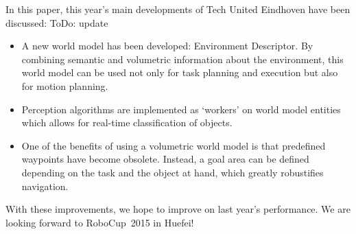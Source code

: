 In this paper, this year's main developments of Tech United Eindhoven have been discussed: ToDo: update
\begin{itemize}
	\item A new world model has been developed: Environment Descriptor. By combining semantic and volumetric information about the environment, this world model can be used not only for task planning and execution but also for motion planning.
	\item Perception algorithms are implemented as `workers' on world model entities which allows for real-time classification of objects.
	\item One of the benefits of using a volumetric world model is that predefined waypoints have become obsolete. Instead, a goal area can be defined depending on the task and the object at hand, which greatly robustifies navigation.
\end{itemize}
With these improvements, we hope to improve on last year's performance. We are looking forward to RoboCup~2015 in Huefei! 